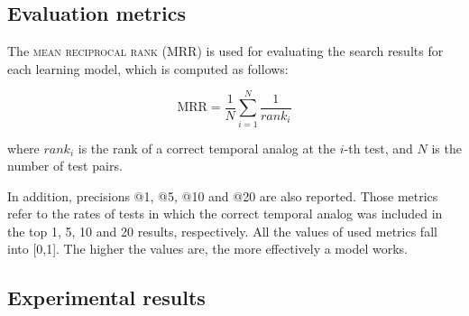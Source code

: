 \documentclass[output=paper]{langsci/langscibook}
\begin{document}
\subsection{Evaluation metrics}
The \textsc{mean reciprocal rank} (MRR) is used for evaluating the search results for each learning model, which is computed as follows:

\begin{equation}\tag{10}
\text{MRR} = \frac{1}{N}\sum_{i = 1}^{N}\frac{1}{\textit{rank}_{i}}
\end{equation}

where $\textit{rank}_{i}$ is the rank of a correct temporal analog at the $i$-th test, and $N$ is the number of test pairs.

In addition, precisions @1, @5, @10 and @20 are also reported. Those metrics refer to the rates of tests in which the correct temporal analog was included in the top 1, 5, 10 and 20 results, respectively. All the values of used metrics fall into [0,1]. The higher the values are, the more effectively a model works.

\subsection{Experimental results}
\begin{table}\footnotesize
\caption{Performance of all analyzed models for learning dynamic word embeddings.\label{RQ1}}
\end{table}
\end{document}
